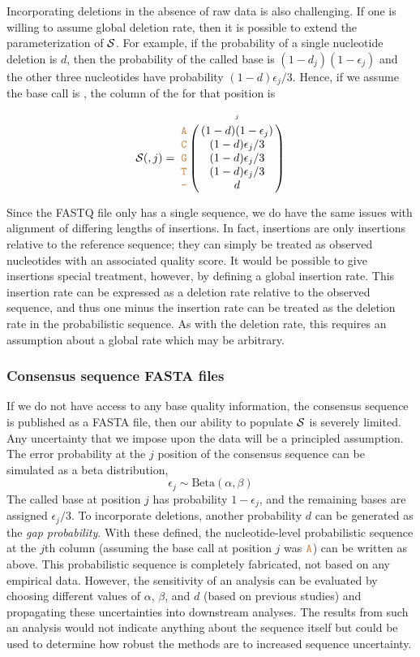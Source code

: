 \documentclass[10pt]{article}
\begin{document}
Incorporating deletions in the absence of raw data is also challenging.
If one is willing to assume global deletion rate, then it is possible to extend the parameterization of $\mathcal{S}$.
For example, if the probability of a single nucleotide deletion is $d$, then the probability of the called base is $(1-d_j)(1-\epsilon_j)$ and the other three nucleotides have probability $(1-d)\epsilon_j/3$.
Hence, if we assume the base call is , the column of the \nlps for that position is
\begin{equation}
\nps(,j) = 
\bordermatrix{
&\scriptscriptstyle{j}  \cr
\sq{A} & (1 - d)(1-\epsilon_j) \cr
\sq{C} & (1 - d)\epsilon_j/3 \cr
\sq{G} & (1 - d)\epsilon_j/3 \cr
\sq{T} & (1 - d)\epsilon_j/3 \cr
\sq{-} & d \cr
}
\label{eq:deletion}
\end{equation}

Since the FASTQ file only has a single sequence, we do have the same issues with alignment of differing lengths of insertions.
In fact, insertions are only insertions relative to the reference sequence; they can simply be treated as observed nucleotides with an associated quality score.
It would be possible to give insertions special treatment, however, by defining a global insertion rate.
This insertion rate can be expressed as a deletion rate relative to the observed sequence, and thus one minus the insertion rate can be treated as the deletion rate in the probabilistic sequence.
As with the deletion rate, this requires an assumption about a global rate which may be arbitrary.


\subsubsection{Consensus sequence FASTA files}


If we do not have access to any base quality information, \eg the consensus sequence is published as a FASTA file, then our ability to populate $\mathcal{S}$ is severely limited.
Any uncertainty that we impose upon the data will be a principled assumption.
The error probability at the $j$ position of the consensus sequence can be simulated as a beta distribution, \ie 
$$
\epsilon_j \sim\text{Beta}(\alpha, \beta)
$$
The called base at position $j$ has probability $1-\epsilon_j$, and the remaining bases are assigned $\epsilon_j/3$.
To incorporate deletions, another probability $d$ can be generated as the \emph{gap probability}.
With these defined, the nucleotide-level probabilistic sequence at the $j$th column (assuming the base call at position $j$ was $\texttt{\textcolor{brown}{A}}$) can be written as above.
This probabilistic sequence is completely fabricated, \ie not based on any empirical data.
However, the sensitivity of an analysis can be evaluated by choosing different values of $\alpha$, $\beta$, and $d$ (\eg based on previous studies) and propagating these uncertainties into downstream analyses.
The results from such an analysis would not indicate anything about the sequence itself but could be used to determine how robust the methods are to increased sequence uncertainty.
\end{document}
